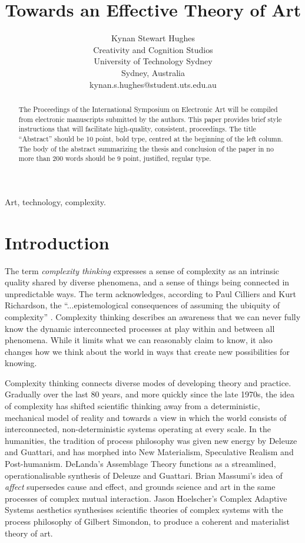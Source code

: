 \documentclass[letterpaper]{article}
\title{Towards an Effective Theory of Art}
\author{Kynan Stewart Hughes\\
Creativity and Cognition Studios\\
University of Technology Sydney\\
Sydney, Australia\\
kynan.s.hughes@student.uts.edu.au\\
\newline
\newline
}
\begin{document}
 
\maketitle
\begin{abstract}
The Proceedings of the International Symposium on Electronic
Art will be compiled from electronic manuscripts submitted by
the authors. This paper provides brief style instructions that will
facilitate high-quality, consistent, proceedings. The title
``Abstract'' should be 10 point, bold type, centred at the
beginning of the left column. The body of the abstract
summarizing the thesis and conclusion of the paper in no more
than 200 words should be 9 point, justified, regular type.
\end{abstract}


Art, technology, complexity.

\section{Introduction}

    The term \emph{complexity thinking} expresses a sense of complexity as an intrinsic quality shared by diverse phenomena, and a sense of things being connected in unpredictable ways. The term acknowledges, according to Paul Cilliers and Kurt Richardson, the “...epistemological consequences of assuming the ubiquity of complexity” \citep{CilliersRichardsonCmplxtyScnc2001}. Complexity thinking describes an awareness that we can never fully know the dynamic interconnected processes at play within and between all phenomena. While it limits what we can reasonably claim to know, it also changes how we think about the world in ways that create new possibilities for knowing. 

    Complexity thinking connects diverse modes of developing theory and practice. Gradually over the last 80 years, and more quickly since the late 1970s, the idea of complexity has shifted scientific thinking away from a deterministic, mechanical model of reality and towards a view in which the world consists of interconnected, non-deterministic systems operating at every scale. In the humanities, the tradition of process philosophy was given new energy by Deleuze and Guattari, and has morphed into New Materialism, Speculative Realism and Post-humanism. DeLanda's Assemblage Theory functions as a streamlined, operationalisable synthesis of Deleuze and Guattari. Brian Massumi's idea of \emph{affect} supersedes cause and effect, and grounds science and art in the same processes of complex mutual interaction. Jason Hoelscher's Complex Adaptive Systems aesthetics synthesises scientific theories of complex systems with the process philosophy of Gilbert Simondon, to produce a coherent and materialist theory of art.
\end{document}
